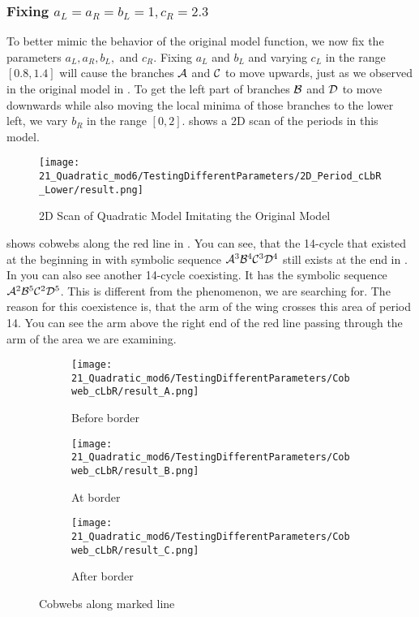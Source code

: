 \subsubsection{Fixing $a_L = a_R = b_L = 1, c_R = 2.3$}

To better mimic the behavior of the original model function, we now fix the parameters $a_L, a_R, b_L,$ and $c_R$.
Fixing $a_L$ and $b_L$ and varying $c_L$ in the range $[0.8, 1.4]$ will cause the branches $\mathcal{A}$ and $\mathcal{C}$ to move upwards, just as we observed in the original model in .
To get the left part of branches $\mathcal{B}$ and $\mathcal{D}$ to move downwards while also moving the local minima of those branches to the lower left, we vary $b_R$ in the range $[0, 2]$.
 shows a 2D scan of the periods in this model.


\begin{figure}
    \centering
    \texttt{[image: 21\_Quadratic\_mod6/TestingDifferentParameters/2D\_Period\_cLbR\_Lower/result.png]}
    \caption{2D Scan of Quadratic Model Imitating the Original Model}
    \label{fig:quadratic.full.cLbR.2d.full}
\end{figure}

 shows cobwebs along the red line in .
You can see, that the 14-cycle that existed at the beginning in  with symbolic sequence $\mathcal{A}^3\mathcal{B}^4\mathcal{C}^3\mathcal{D}^4$ still exists at the end in .
In  you can also see another 14-cycle coexisting.
It has the symbolic sequence $\mathcal{A}^2\mathcal{B}^5\mathcal{C}^2\mathcal{D}^5$.
This is different from the phenomenon, we are searching for.
The reason for this coexistence is, that the arm of the wing crosses this area of period 14.
You can see the arm above the right end of the red line passing through the arm of the area we are examining.

\begin{figure}
    \centering
    \begin{subfigure}{0.3\textwidth}
        \centering
        \texttt{[image: 21\_Quadratic\_mod6/TestingDifferentParameters/Cobweb\_cLbR/result\_A.png]}
        \caption{Before border}
        \label{fig:quad.full.cLbR.CobwebA}
    \end{subfigure}
    \begin{subfigure}{0.3\textwidth}
        \centering
        \texttt{[image: 21\_Quadratic\_mod6/TestingDifferentParameters/Cobweb\_cLbR/result\_B.png]}
        \caption{At border}
        \label{fig:quad.full.cLbR.CobwebB}
    \end{subfigure}
    \begin{subfigure}{0.3\textwidth}
        \centering
        \texttt{[image: 21\_Quadratic\_mod6/TestingDifferentParameters/Cobweb\_cLbR/result\_C.png]}
        \caption{After border}
        \label{fig:quad.full.cLbR.CobwebC}
    \end{subfigure}
    \caption{Cobwebs along marked line}
    \label{fig:quad.full.cLbR.Cobwebs}
\end{figure}
